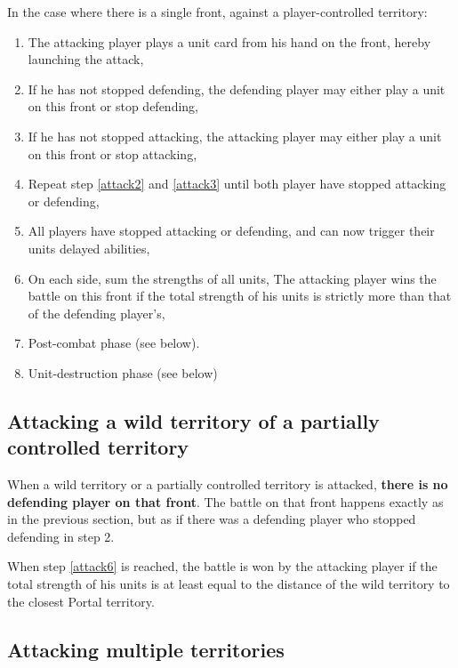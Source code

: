 \documentclass[a4paper]{article}
\begin{document}
    \hspace{-2em} In the case where there is a single front,
    against a player-controlled territory:
    \vspace{-1.3em}
    \begin{enumerate}
        \item The attacking player plays a unit card from his hand on the front,
        hereby launching the attack,
        \item If he has not stopped defending, \label{attack2}
        the defending player may either play a unit on this front or stop defending,
        \item If he has not stopped attacking, \label{attack3}
        the attacking player may either play a unit on this front or stop attacking,
        \item Repeat step \ref{attack2} and \ref{attack3} until both player have
        stopped attacking or defending,
        \item All players have stopped attacking or defending,
        and can now trigger their units delayed abilities, \label{attack5}
        \item On each side, sum the strengths of all units, \label{attack6}
        The attacking player wins the battle on this front if the total strength
        of his units is strictly more than that of the defending player's,
        \item Post-combat phase (see below).
        \item Unit-destruction phase (see below)
    \end{enumerate}
    

  \subsection{Attacking a wild territory of a partially controlled territory}
    
    When a wild territory or a partially controlled territory is attacked,
    \textbf{there is no defending player on that front}.
    The battle on that front happens exactly as in the previous section,
    but as if there was a defending player who stopped defending in step 2.
    
    When step \ref{attack6} is reached, the battle is won by the attacking player
    if the total strength of his units is at least equal to the distance
    of the wild territory to the closest Portal territory.
    

  \subsection{Attacking multiple territories}
    
\end{document}
